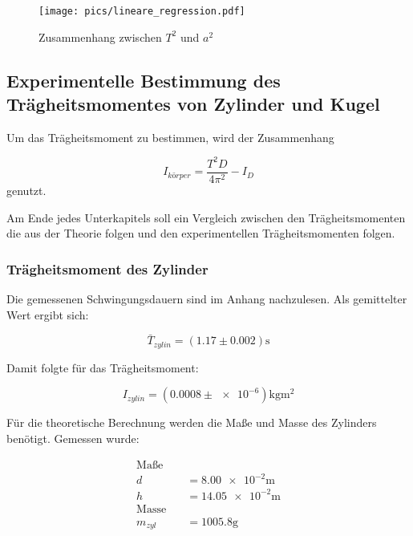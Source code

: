 \begin{figure}
  \centering
  \texttt{[image: pics/lineare\_regression.pdf]}
  \caption{Zusammenhang zwischen $T^2$ und $a^2$}
  \label{fig:zusammenhang_a_T}
\end{figure}


\subsection{Experimentelle Bestimmung des Trägheitsmomentes von Zylinder und Kugel}

Um das Trägheitsmoment zu bestimmen, wird der Zusammenhang

\begin{equation*}
I_{körper}=\frac{T^2 D}{4\pi^2}-I_D
\end{equation*}
genutzt.

Am Ende jedes Unterkapitels soll ein Vergleich zwischen den
Trägheitsmomenten die aus der Theorie folgen und den
experimentellen Trägheitsmomenten folgen. %

\subsubsection{Trägheitsmoment des Zylinder}

Die gemessenen Schwingungsdauern sind im Anhang nachzulesen.
Als gemittelter Wert ergibt sich:

\begin{equation*}
\bar{T}_{zylin}=\left(\num{1.17}\pm\num{0.002}\right)\si{\second}
\end{equation*}

Damit folgte für das Trägheitsmoment:

\begin{equation}
\label{eq:traeg_zylinder_grau_exp}
I_{zylin}=\left(\num{0.0008}\pm\num{e-6}\right)\si{\kilogram\meter\squared}
\end{equation}

Für die theoretische Berechnung werden die Maße und Masse des Zylinders benötigt.
Gemessen wurde:

\begin{align*}
\text{Maße} \quad &\\
d&=\num{8.00e-2}\si{\meter}\\
h&=\num{14.05e-2}\si{\meter}\\
\text{Masse} \quad &\\
m_{zyl}&=\num{1005.8}\si{\gram}
\end{align*}

